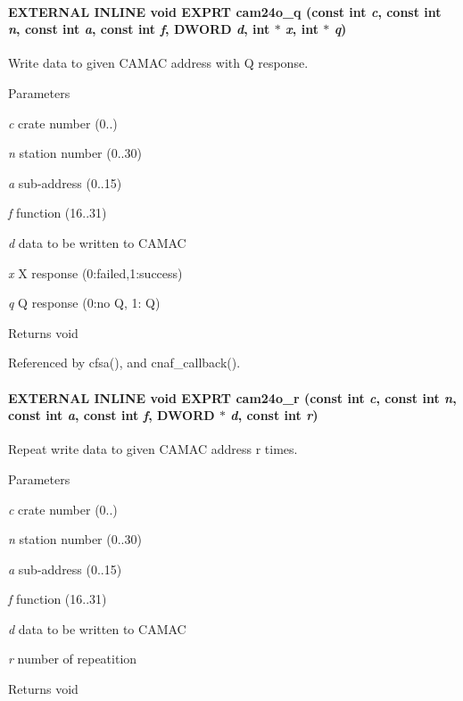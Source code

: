 \paragraph[{cam24o\_\-q}]{\setlength{\rightskip}{0pt plus 5cm}EXTERNAL INLINE void EXPRT cam24o\_\-q (const int {\em c}, \/  const int {\em n}, \/  const int {\em a}, \/  const int {\em f}, \/  {\bf DWORD} {\em d}, \/  int $\ast$ {\em x}, \/  int $\ast$ {\em q})}\hfill\label{group__mcstdfunctionh_gaefe50b118a37b83b19a3804a6759d8bd}
Write data to given CAMAC address with Q response. 
\begin{DoxyParams}{Parameters}
\item[{\em c}]crate number (0..) \item[{\em n}]station number (0..30) \item[{\em a}]sub-\/address (0..15) \item[{\em f}]function (16..31) \item[{\em d}]data to be written to CAMAC \item[{\em x}]X response (0:failed,1:success) \item[{\em q}]Q response (0:no Q, 1: Q) \end{DoxyParams}
\begin{DoxyReturn}{Returns}
void 
\end{DoxyReturn}


Referenced by cfsa(), and cnaf\_\-callback().
\paragraph[{cam24o\_\-r}]{\setlength{\rightskip}{0pt plus 5cm}EXTERNAL INLINE void EXPRT cam24o\_\-r (const int {\em c}, \/  const int {\em n}, \/  const int {\em a}, \/  const int {\em f}, \/  {\bf DWORD} $\ast$ {\em d}, \/  const int {\em r})}\hfill\label{group__mcstdfunctionh_gae776beaa8eae13f75edf286ed0a75a88}
Repeat write data to given CAMAC address r times. 
\begin{DoxyParams}{Parameters}
\item[{\em c}]crate number (0..) \item[{\em n}]station number (0..30) \item[{\em a}]sub-\/address (0..15) \item[{\em f}]function (16..31) \item[{\em d}]data to be written to CAMAC \item[{\em r}]number of repeatition \end{DoxyParams}
\begin{DoxyReturn}{Returns}
void 
\end{DoxyReturn}
